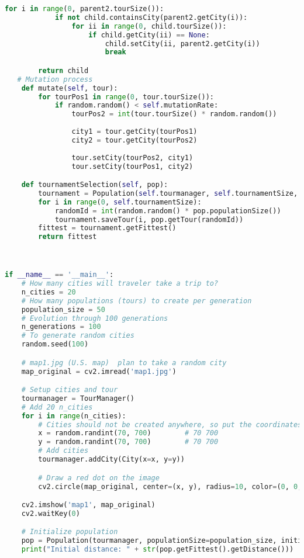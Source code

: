 \documentclass[12pt]{article}
\begin{document}
\begin{lstlisting}[language=Python]
        for i in range(0, parent2.tourSize()):
            if not child.containsCity(parent2.getCity(i)):
                for ii in range(0, child.tourSize()):
                    if child.getCity(ii) == None:
                        child.setCity(ii, parent2.getCity(i))
                        break

        return child
   # Mutation process
    def mutate(self, tour):
        for tourPos1 in range(0, tour.tourSize()):
            if random.random() < self.mutationRate:
                tourPos2 = int(tour.tourSize() * random.random())
                
                city1 = tour.getCity(tourPos1)
                city2 = tour.getCity(tourPos2)
                
                tour.setCity(tourPos2, city1)
                tour.setCity(tourPos1, city2)

    def tournamentSelection(self, pop):
        tournament = Population(self.tourmanager, self.tournamentSize, False)
        for i in range(0, self.tournamentSize):
            randomId = int(random.random() * pop.populationSize())
            tournament.saveTour(i, pop.getTour(randomId))
        fittest = tournament.getFittest()
        return fittest



if __name__ == '__main__':
    # How many cities will traveler take a trip to?
    n_cities = 20
    # How many populations (tours) to create per generation
    population_size = 50
    # Evolution through 100 generations
    n_generations = 100
    # To generate random cities
    random.seed(100)

    # map1.jpg (U.S. map)  plan to take a random city
    map_original = cv2.imread('map1.jpg')

    # Setup cities and tour
    tourmanager = TourManager()
    # Add 20 n_cities
    for i in range(n_cities):
        # Cities should not be created anywhere, so put the coordinates in x and y respectively
        x = random.randint(70, 700)        # 70 700
        y = random.randint(70, 700)        # 70 700
        # Add cities
        tourmanager.addCity(City(x=x, y=y))

        # Draw a red dot on the image
        cv2.circle(map_original, center=(x, y), radius=10, color=(0, 0, 255), thickness=-1, lineType=cv2.LINE_AA)

    cv2.imshow('map1', map_original)
    cv2.waitKey(0)

    # Initialize population
    pop = Population(tourmanager, populationSize=population_size, initialise=True)
    print("Initial distance: " + str(pop.getFittest().getDistance()))


\end{lstlisting}
\end{document}
